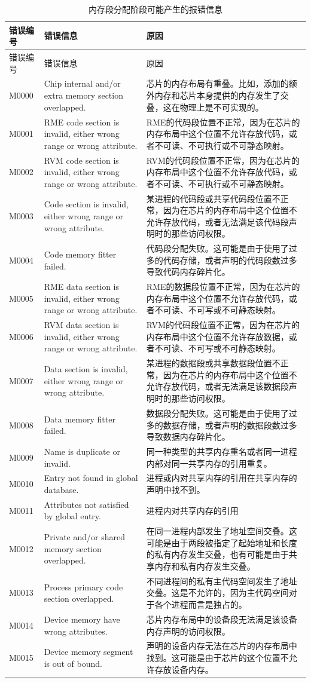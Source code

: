 \begin{xltabular}{\textwidth}{@{}>{\hsize\raggedright\arraybackslash}X>{\hsize\raggedright\arraybackslash}X>{\hsize\raggedright\arraybackslash}X@{}}
\caption{内存段分配阶段可能产生的报错信息}\label{tab:5-19}\\
\toprule
错误编号 & 错误信息 & 原因\tabularnewline
\endfirsthead
\toprule
错误编号 & 错误信息 & 原因\tabularnewline
\midrule
\endhead
\bottomrule
\endlastfoot
M0000 & Chip internal and/or extra memory section overlapped. &
芯片的内存布局有重叠。比如，添加的额外内存和芯片本身提供的内存发生了交叠，这在物理上是不可实现的。\tabularnewline
M0001 & RME code section is invalid, either wrong range or wrong
attribute. &
RME的代码段位置不正常，因为在芯片的内存布局中这个位置不允许存放代码，或者不可读、不可执行或不可静态映射。\tabularnewline
M0002 & RVM code section is invalid, either wrong range or wrong
attribute. &
RVM的代码段位置不正常，因为在芯片的内存布局中这个位置不允许存放代码，或者不可读、不可执行或不可静态映射。\tabularnewline
M0003 & Code section is invalid, either wrong range or wrong attribute.
&
某进程的代码段或共享代码段位置不正常，因为在芯片的内存布局中这个位置不允许存放代码，或者无法满足该代码段声明时的那些访问权限。\tabularnewline
M0004 & Code memory fitter failed. &
代码段分配失败。这可能是由于使用了过多的代码存储，或者声明的代码段数过多导致代码内存碎片化。\tabularnewline
M0005 & RME data section is invalid, either wrong range or wrong
attribute. &
RME的数据段位置不正常，因为在芯片的内存布局中这个位置不允许存放代码，或者不可读、不可写或不可静态映射。\tabularnewline
M0006 & RVM data section is invalid, either wrong range or wrong
attribute. &
RVM的代码段位置不正常，因为在芯片的内存布局中这个位置不允许存放数据，或者不可读、不可写或不可静态映射。\tabularnewline
M0007 & Data section is invalid, either wrong range or wrong attribute.
&
某进程的数据段或共享数据段位置不正常，因为在芯片的内存布局中这个位置不允许存放代码，或者无法满足该数据段声明时的那些访问权限。\tabularnewline
M0008 & Data memory fitter failed. &
数据段分配失败。这可能是由于使用了过多的数据存储，或者声明的数据段数过多导致数据内存碎片化。\tabularnewline
M0009 & Name is duplicate or invalid. &
同一种类型的共享内存重名或者同一进程内部对同一共享内存的引用重复。\tabularnewline
M0010 & Entry not found in global database. &
进程或内对共享内存的引用在共享内存的声明中找不到。\tabularnewline
M0011 & Attributes not satisfied by global entry. &
进程内对共享内存的引用\tabularnewline
M0012 & Private and/or shared memory section overlapped. &
在同一进程内部发生了地址空间交叠。这可能是由于两段被指定了起始地址和长度的私有内存发生交叠，也有可能是由于共享内存和私有内存发生交叠。\tabularnewline
M0013 & Process primary code section overlapped. &
不同进程间的私有主代码空间发生了地址交叠。这是不允许的，因为主代码空间对于各个进程而言是独占的。\tabularnewline
M0014 & Device memory have wrong attributes. &
芯片内存布局中的设备段无法满足该设备内存声明的访问权限。\tabularnewline
M0015 & Device memory segment is out of bound. &
声明的设备内存无法在芯片的内存布局中找到。这可能是由于芯片的这个位置不允许存放设备内存。\tabularnewline
\end{xltabular}

